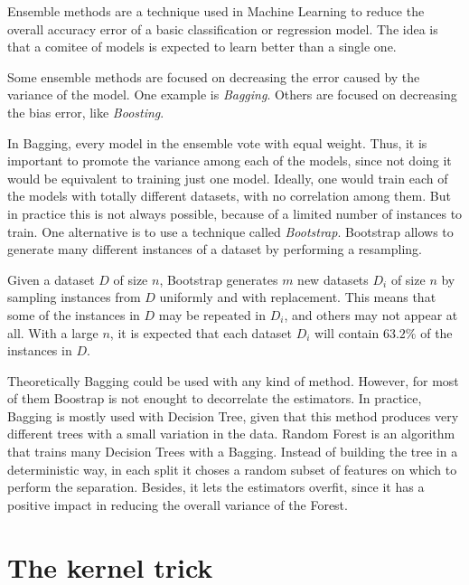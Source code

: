   \begin{pre-delivery}
    Ensemble methods\cite{polikar2006ensemble} are a technique used in Machine
    Learning to reduce the
    overall accuracy error of a basic classification or regression model. The
    idea is that a comitee of models is expected to learn better than a single
    one.

    Some ensemble methods are focused on decreasing the error caused by the
    variance of the model. One example is \textit{Bagging}\cite{breiman1996bagging}. Others are focused
    on decreasing the bias error, like \textit{Boosting}\cite{freund1997decision}.

    In Bagging, every model in the ensemble vote with equal weight. Thus, it is
    important to promote the variance among each of the models, since not doing
    it would be equivalent to training just one model. Ideally, one would train
    each of the models with totally different datasets, with no correlation
    among them. But in practice this is not always possible, because of a
    limited number of instances to train. One alternative is to use a
    technique called \textit{Bootstrap}\cite{efron1994introduction}. Bootstrap allows to generate
    many different instances of a dataset by performing a resampling.

    Given a dataset $D$ of size $n$, Bootstrap generates $m$ new datasets
    $D_i$ of size $n$ by sampling instances from $D$ uniformly and with
    replacement. This means that some of the instances in $D$ may be repeated
    in $D_i$, and others may not appear at all. With a large $n$, it is expected
    that each dataset $D_i$ will contain $63.2 \% $ of the instances in $D$.

    Theoretically Bagging could be used with any kind of method. However, for
    most of them Boostrap is not enought to decorrelate the estimators.
    In practice, Bagging is mostly used with Decision Tree, given that this
    method produces very different trees with a small variation in the data.
    Random Forest\cite{Breiman2001} is an algorithm that trains many Decision Trees with a
    Bagging. Instead of building the tree in a deterministic way, in each
    split it choses a random subset of features on which to perform the
    separation. Besides, it lets the estimators overfit, since it has a positive
    impact in reducing the overall variance of the Forest.
  \end{pre-delivery}

\section{The kernel trick}
\label{sec:kern-trick}




